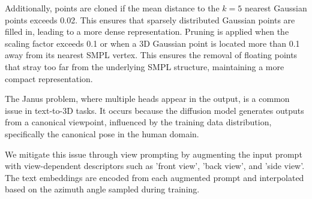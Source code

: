 Additionally, points are cloned if the mean distance to the $k = 5$ nearest Gaussian points exceeds 0.02. This ensures that sparsely distributed Gaussian points are filled in, leading to a more dense representation.
Pruning is applied when the scaling factor exceeds 0.1 or when a 3D Gaussian point is located more than 0.1 away from its nearest SMPL vertex. This ensures the removal of floating points that stray too far from the underlying SMPL structure, maintaining a more compact representation.

 The Janus problem, where multiple heads appear in the output, is a common issue in text-to-3D tasks. It occurs because the diffusion model generates outputs from a canonical viewpoint, influenced by the training data distribution, specifically the canonical pose in the human domain. 



We mitigate this issue through view prompting by augmenting the input prompt with view-dependent descriptors such as 'front view', 'back view', and 'side view'. The text embeddings are encoded from each augmented prompt and interpolated based on the azimuth angle sampled during training.






